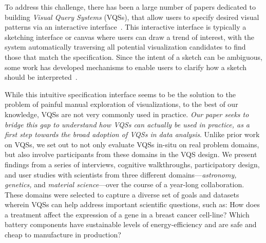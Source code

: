 \par To address this challenge, 
there has been a large number of papers 
dedicated to building {\em Visual Query Systems} (VQSs), 
that allow users to specify 
desired visual patterns 
via an interactive interface~\cite{mohebbi2011google,Hochheiser2004,wattenberg2001sketching,Siddiqui2017VLDB,ryall2005querylines,correll2016semantics,Mannino2018,Eichmann2015,Holz2009}. 
This interactive interface is typically 
a sketching interface or canvas
where users can draw a trend of interest,
with the system automatically traversing 
all potential visualization candidates 
to find those that match the specification. 
Since the intent of a sketch can be ambiguous, 
some work has developed mechanisms to
enable users to clarify 
how a sketch should be interpreted~\cite{ryall2005querylines,correll2016semantics,Mannino2018,Eichmann2015,Holz2009}. 

\par 
While this intuitive 
specification interface 
seems to be the solution 
to the problem of painful manual exploration of visualizations, 
to the best of our knowledge, VQSs are not very commonly used in practice. 
{\em Our paper seeks to bridge this gap 
to understand how VQSs can actually be used in practice, 
as a first step towards the broad adoption of VQSs in data analysis}.
Unlike prior work on VQSs,
we set out to not only evaluate VQSs in-situ on
real problem domains, but also involve participants
from these domains in the VQS design. 
We present findings from a series of interviews, 
cognitive walkthroughs, participatory design, 
and user studies with scientists from three different domains---{\em astronomy, genetics,} and {\em material science}---over the course of 
a year-long collaboration. 
These domains were selected to capture 
a diverse set of goals 
and datasets wherein VQSs can help address 
important scientific questions, such as: 
How does a treatment affect the expression 
of a gene in a breast cancer cell-line? 
Which battery components have sustainable 
levels of energy-efficiency and are safe and 
cheap to manufacture in production?

